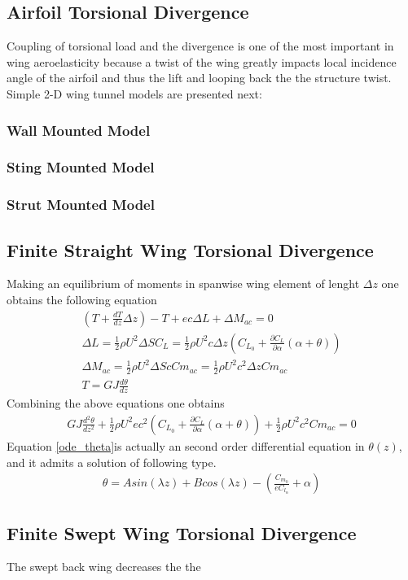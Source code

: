 \subsection{Airfoil Torsional Divergence}
Coupling of torsional load and the divergence is one of the most important in wing aeroelasticity because a twist of the wing greatly impacts local incidence angle of the airfoil and thus the lift and looping back the the structure twist.
Simple 2-D wing tunnel models are presented next:

\subsubsection{Wall Mounted Model}

\subsubsection{Sting Mounted Model}

\subsubsection{Strut Mounted Model}

\subsection{Finite Straight Wing Torsional Divergence}
Making an equilibrium of moments in spanwise wing element of lenght $\Delta z$ one obtains the following equation
\begin{align}
\left( T+\frac{d T}{d z}\Delta z \right)-T +ec\Delta L + \Delta M_{ac}=0\\
\Delta L= \frac{1}{2} \rho U^2 \Delta S C_L = \frac{1}{2} \rho U^2 c \Delta z \left( C_{L_0} + \frac{\partial C_L}{\partial \alpha}(\alpha + \theta) \right)\\
\Delta M_{ac}= \frac{1}{2} \rho U^2 \Delta S c Cm_{ac} = \frac{1}{2} \rho U^2 c^2 \Delta z Cm_{ac}\\
T=GJ \frac{d \theta}{dz}
\end{align}
Combining the above equations one obtains
\begin{align}
GJ\frac{d^2 \theta}{dz^2} + \frac{1}{2} \rho U^2 ec^2 \left( C_{L_0} + \frac{\partial C_L}{\partial \alpha}(\alpha + \theta) \right) + \frac{1}{2} \rho U^2 c^2 Cm_{ac}=0 \label{ode_theta}
\end{align}
Equation \eqref{ode_theta}is actually an second order differential equation in $\theta(z)$, and it admits a solution of following type.
\begin{align}
\theta= A sin(\lambda z) + B cos(\lambda z) - \left(\frac{C_{m_0}}{e C_{l_\alpha}} + \alpha \right)
\end{align}




\subsection{Finite Swept Wing Torsional Divergence}
The swept back wing decreases the the
